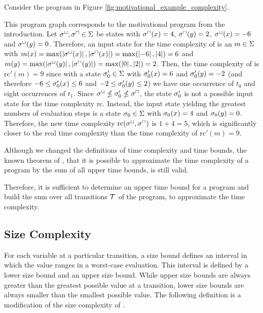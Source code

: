 \begin{example}
  Consider the program in Figure \ref{fig:motivational_example_complexity}.
  
  This program graph corresponds to the motivational program from the introduction.
  Let ${\sigma^\sqcup}, {\sigma^\sqcap} \in \Sigma$ be states with ${\sigma^\sqcap}(x) = 4$, ${\sigma^\sqcap}(y) = 2$, ${\sigma^\sqcup}(x) = -6$ and ${\sigma^\sqcup}(y) = 0$.
  Therefore, an input state for the time complexity of \cite{koat} is an $m \in \Sigma$ with $m(x) = \max(\left|{\sigma^\sqcup}(x)\right|, \left|{\sigma^\sqcap}(x)\right|) = \max(\left|-6\right|, \left|4\right|) = 6$ and $m(y) = \max(\left|{\sigma^\sqcup}(y)\right|, \left|{\sigma^\sqcap}(y)\right|) = \max(\left|0\right|, \left|2\right|) = 2$.
  Then, the time complexity of \cite{koat} is $\text{rc}'(m) = 9$ since with a state $\sigma'_0 \in \Sigma$ with $\sigma'_0(x) = 6$ and $\sigma'_0(y) = -2$ (and therefore $-6 \leq \sigma'_0(x) \leq 6$ and $-2 \leq \sigma'_0(y) \leq 2$) we have one occurrence of $t_0$ and eight occurrences of $t_1$.
  Since ${\sigma^\sqcup} \nleq \sigma'_0 \nleq {\sigma^\sqcap}$, the state $\sigma'_0$ is not a possible input state for the time complexity $\text{rc}$.
  Instead, the input state yielding the greatest numbers of evaluation steps is a state $\sigma_0 \in \Sigma$ with $\sigma_0(x) = 4$ and $\sigma_0(y) = 0$.
  Therefore, the new time complexity $\text{rc}({\sigma^\sqcup}, {\sigma^\sqcap})$ is $1 + 4 = 5$, which is significantly closer to the real time complexity than the time complexity of \cite{koat} $\text{rc}'(m) = 9$.
\end{example}
  
Although we changed the definitions of time complexity and time bounds, the known theorem of \cite{koat}, that it is possible to approximate the time complexity of a program by the sum of all upper time bounds, is still valid.



Therefore, it is sufficient to determine an upper time bound for a program and build the sum over all transitions $\mathcal{T}$ of the program, to approximate the time complexity. 

\subsection{Size Complexity}

For each variable at a particular transition, a size bound defines an interval in which the value ranges in a worst-case evaluation.
This interval is defined by a lower size bound and an upper size bound.
While upper size bounds are always greater than the greatest possible value at a transition, lower size bounds are always smaller than the smallest possible value.
The following definition is a modification of the size complexity of \cite{koat}.


